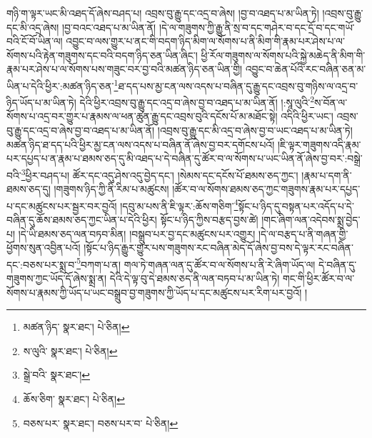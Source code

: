 གཉི་ག་ལྟར་ཡང་མི་འཐད་དོ་ཞེས་བཤད་པ། འབྲས་བུ་རྒྱུ་དང་འདྲ་བ་ཞེས། །བྱ་བ་འཐད་པ་མ་ཡིན་ཏེ། །འབྲས་བུ་རྒྱུ་དང་མི་འདྲ་ཞེས། །བྱ་བའང་འཐད་པ་མ་ཡིན་ནོ། །དེ་ལ་གཟུགས་ཀྱི་རྒྱུ་ནི་སྲ་བ་དང་གཤེར་བ་དང་དྲོ་བ་དང་གཡོ་བའི་ངོ་བོ་ཡིན་ལ། འབྱུང་བ་ལས་གྱུར་པ་ནང་གི་བདག་ཉིད་མིག་ལ་སོགས་པ་ནི་མིག་གི་རྣམ་པར་ཤེས་པ་ལ་སོགས་པའི་རྟེན་གཟུགས་དང་བའི་བདག་ཉིད་ཅན་ཡིན་ཞིང་། ཕྱི་རོལ་གཟུགས་ལ་སོགས་པའི་སྐྱེ་མཆེད་ནི་མིག་གི་རྣམ་པར་ཤེས་པ་ལ་སོགས་པས་གཟུང་བར་བྱ་བའི་མཚན་ཉིད་ཅན་ཡིན་གྱི། འབྱུང་བ་ཆེན་པོའི་རང་བཞིན་ཅན་མ་ཡིན་པ་དེའི་ཕྱིར་:མཚན་ཉིད་ཅན་\footnote{མཚན་ཉིད་  སྣར་ཐང་།  པེ་ཅིན། }ཐ་དད་པས་མྱ་ངན་ལས་འདས་པ་བཞིན་དུ་རྒྱུ་དང་འབྲས་བུ་གཉིས་ལ་འདྲ་བ་ཉིད་ཡོད་པ་མ་ཡིན་ཏེ། དེའི་ཕྱིར་འབྲས་བུ་རྒྱུ་དང་འདྲ་བ་ཞེས་བྱ་བ་འཐད་པ་མ་ཡིན་ནོ། །:སཱ་ལུའི་\footnote{ས་ལུའི་  སྣར་ཐང་།  པེ་ཅིན། }ས་བོན་ལ་སོགས་པ་འདྲ་བར་གྱུར་པ་རྣམས་ལ་ཕན་ཚུན་རྒྱུ་དང་འབྲས་བུའི་དངོས་པོ་མ་མཐོང་སྟེ། འདིའི་ཕྱིར་ཡང་། འབྲས་བུ་རྒྱུ་དང་འདྲ་བ་ཞེས་བྱ་བ་འཐད་པ་མ་ཡིན་ནོ། །འབྲས་བུ་རྒྱུ་དང་མི་འདྲ་བ་ཞེས་བྱ་བ་ཡང་འཐད་པ་མ་ཡིན་ཏེ། མཚན་ཉིད་ཐ་དད་པའི་ཕྱིར་མྱ་ངན་ལས་འདས་པ་བཞིན་ནོ་ཞེས་བྱ་བར་དགོངས་པའོ། །ཇི་ལྟར་གཟུགས་འདི་རྣམ་པར་དཔྱད་པ་ན་རྣམ་པ་ཐམས་ཅད་དུ་མི་འཐད་པ་དེ་བཞིན་དུ་ཚོར་བ་ལ་སོགས་པ་ཡང་ཡིན་ནོ་ཞེས་བྱ་བར་:བསྒྲེ་བའི་\footnote{སྒྲེ་བའི་  སྣར་ཐང་། }ཕྱིར་བཤད་པ། ཚོར་དང་འདུ་ཤེས་འདུ་བྱེད་དང་། །སེམས་དང་དངོས་པོ་ཐམས་ཅད་ཀྱང་། །རྣམ་པ་དག་ནི་ཐམས་ཅད་དུ། །གཟུགས་ཉིད་ཀྱི་ནི་རིམ་པ་མཚུངས། །ཚོར་བ་ལ་སོགས་ཐམས་ཅད་ཀྱང་གཟུགས་རྣམ་པར་དཔྱད་པ་དང་མཚུངས་པར་སྦྱར་བར་བྱའོ། །དབུ་མ་པས་ནི་ཇི་ལྟར་:ཆོས་གཅིག་\footnote{ཆོས་ཅིག་  སྣར་ཐང་།  པེ་ཅིན། }སྟོང་པ་ཉིད་དུ་བསྟན་པར་འདོད་པ་དེ་བཞིན་དུ་ཆོས་ཐམས་ཅད་ཀྱང་ཡིན་པ་དེའི་ཕྱིར། སྟོང་པ་ཉིད་ཀྱིས་བརྩད་བྱས་ཚེ། །གང་ཞིག་ལན་འདེབས་སྨྲ་བྱེད་པ། །དེ་ཡི་ཐམས་ཅད་ལན་བཏབ་མིན། །བསྒྲུབ་པར་བྱ་དང་མཚུངས་པར་འགྱུར། །དེ་ལ་བརྩད་པ་ནི་གཞན་གྱི་ཕྱོགས་སུན་འབྱིན་པའོ། །སྟོང་པ་ཉིད་རྒྱུར་གྱུར་པས་གཟུགས་རང་བཞིན་མེད་དོ་ཞེས་བྱ་བས་དེ་ལྟར་རང་བཞིན་དང་:བཅས་པར་སྨྲ་བ་\footnote{བཅས་པར་  སྣར་ཐང་། བཅས་པར་བ་  པེ་ཅིན། }བཀག་པ་ན། གལ་ཏེ་གཞན་ལན་དུ་ཚོར་བ་ལ་སོགས་པ་ནི་རེ་ཞིག་ཡོད་ལ། དེ་བཞིན་དུ་གཟུགས་ཀྱང་ཡོད་དོ་ཞེས་སྨྲ་ན། དེའི་དེ་ལྟ་བུ་དེ་ཐམས་ཅད་ནི་ལན་བཏབ་པ་མ་ཡིན་ཏེ། གང་གི་ཕྱིར་ཚོར་བ་ལ་སོགས་པ་རྣམས་ཀྱི་ཡོད་པ་ཡང་བསྒྲུབ་བྱ་གཟུགས་ཀྱི་ཡོད་པ་དང་མཚུངས་པར་རིག་པར་བྱའོ། །
